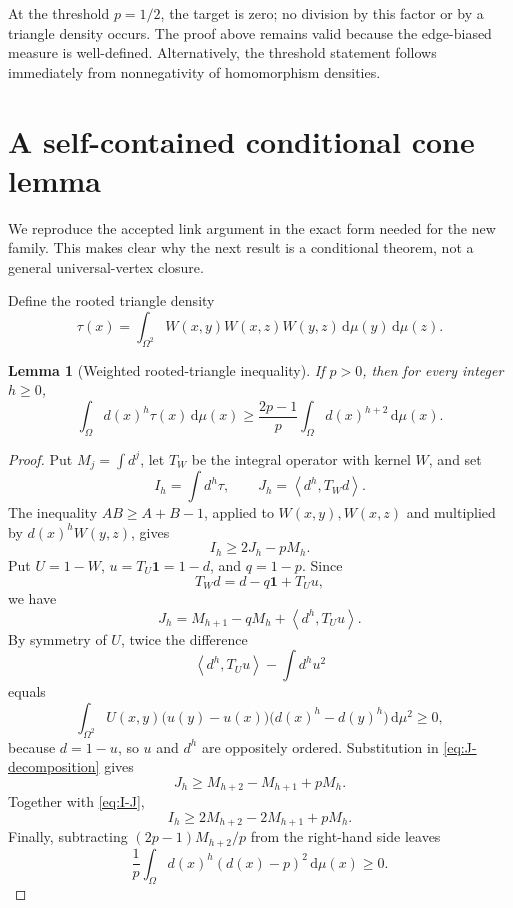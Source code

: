 \documentclass[11pt]{article}
\newtheorem{lemma}[theorem]{Lemma}
\newcommand{\dd}{\,\mathrm{d}}
\newcommand{\one}{\mathbf{1}}
\newcommand{\ip}[2]{\left\langle #1,#2\right\rangle}
\begin{document}
At the threshold $p=1/2$, the target is zero; no division by this factor or
by a triangle density occurs.  The proof above remains valid because the
edge-biased measure is well-defined.  Alternatively, the threshold statement
follows immediately from nonnegativity of homomorphism densities.


\section{A self-contained conditional cone lemma}

We reproduce the accepted link argument in the exact form needed for the
new family.  This makes clear why the next result is a conditional theorem,
not a general universal-vertex closure.

Define the rooted triangle density
\[
 \tau(x)=\int_{\Omega^2}
 W(x,y)W(x,z)W(y,z)\dd\mu(y)\dd\mu(z).
\]

\begin{lemma}[Weighted rooted-triangle inequality]
\label{lem:weighted-triangle}
If $p>0$, then for every integer $h\geq0$,
\[
 \int_\Omega d(x)^h\tau(x)\dd\mu(x)
 \geq\frac{2p-1}{p}\int_\Omega d(x)^{h+2}\dd\mu(x).
\]
\end{lemma}

\begin{proof}
Put $M_j=\int d^j$, let $T_W$ be the integral operator with kernel $W$,
and set
\[
 I_h=\int d^h\tau,
 \qquad
 J_h=\ip{d^h}{T_Wd}.
\]
The inequality $AB\geq A+B-1$, applied to $W(x,y),W(x,z)$ and
multiplied by $d(x)^hW(y,z)$, gives
\begin{equation}
 I_h\geq2J_h-pM_h.
 \label{eq:I-J}
\end{equation}
Put $U=1-W$, $u=T_U\one=1-d$, and $q=1-p$.  Since
\[
 T_Wd=d-q\one+T_Uu,
\]
we have
\begin{equation}
 J_h=M_{h+1}-qM_h+\ip{d^h}{T_Uu}.
 \label{eq:J-decomposition}
\end{equation}
By symmetry of $U$, twice the difference
\[
 \ip{d^h}{T_Uu}-\int d^hu^2
\]
equals
\[
 \int_{\Omega^2}U(x,y)
 \bigl(u(y)-u(x)\bigr)
 \bigl(d(x)^h-d(y)^h\bigr)\dd\mu^2\geq0,
\]
because $d=1-u$, so $u$ and $d^h$ are oppositely ordered.  Substitution
in \eqref{eq:J-decomposition} gives
\[
 J_h\geq M_{h+2}-M_{h+1}+pM_h.
\]
Together with \eqref{eq:I-J},
\[
 I_h\geq2M_{h+2}-2M_{h+1}+pM_h.
\]
Finally, subtracting $(2p-1)M_{h+2}/p$ from the right-hand side leaves
\[
 \frac1p\int_\Omega d(x)^h(d(x)-p)^2\dd\mu(x)\geq0.
\]
\end{proof}
\end{document}
